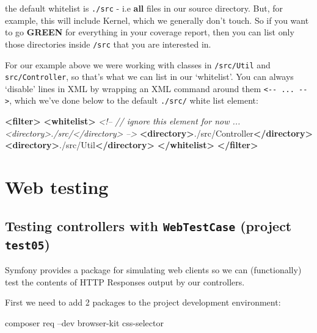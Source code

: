 \documentclass[a4paperpaper,openright]{book}
\newenvironment{Shaded}{}{}
\newcommand{\CommentTok}[1]{\textcolor[rgb]{0.38,0.63,0.69}{\textit{#1}}}
\newcommand{\ExtensionTok}[1]{#1}
\newcommand{\KeywordTok}[1]{\textcolor[rgb]{0.00,0.44,0.13}{\textbf{#1}}}
\newcommand{\NormalTok}[1]{#1}
\begin{document}
the default whitelist is \texttt{./src} - i.e \textbf{all} files in our
source directory. But, for example, this will include Kernel, which we
generally don't touch. So if you want to go \textbf{GREEN} for
everything in your coverage report, then you can list only those
directories inside \texttt{/src} that you are interested in.

For our example above we were working with classes in \texttt{/src/Util}
and \texttt{src/Controller}, so that's what we can list in our
`whitelist'. You can always `disable' lines in XML by wrapping an XML
command around them \texttt{\textless{}-\/-\ ...\ -\/-\textgreater{}},
which we've done below to the default \texttt{./src/} white list
element:

\begin{Shaded}
\begin{Highlighting}[]
    \KeywordTok{<filter>}
        \KeywordTok{<whitelist>}
            \CommentTok{<!--}
\CommentTok{                // ignore this element for now ...}
\CommentTok{                <directory>./src/</directory>}
\CommentTok{            -->}
            \KeywordTok{<directory>}\NormalTok{./src/Controller}\KeywordTok{</directory>}
            \KeywordTok{<directory>}\NormalTok{./src/Util}\KeywordTok{</directory>}
        \KeywordTok{</whitelist>}
    \KeywordTok{</filter>}
\end{Highlighting}
\end{Shaded}

\hypertarget{web-testing}{%
\chapter{Web testing}\label{web-testing}}

\hypertarget{testing-controllers-with-webtestcase-project-test05}{%
\section{\texorpdfstring{Testing controllers with \texttt{WebTestCase}
(project
\texttt{test05})}{Testing controllers with WebTestCase (project test05)}}\label{testing-controllers-with-webtestcase-project-test05}}

Symfony provides a package for simulating web clients so we can
(functionally) test the contents of HTTP Responses output by our
controllers.

First we need to add 2 packages to the project development environment:

\begin{Shaded}
\begin{Highlighting}[]
    \ExtensionTok{composer}\NormalTok{ req --dev browser-kit css-selector}
\end{Highlighting}
\end{Shaded}
\end{document}

